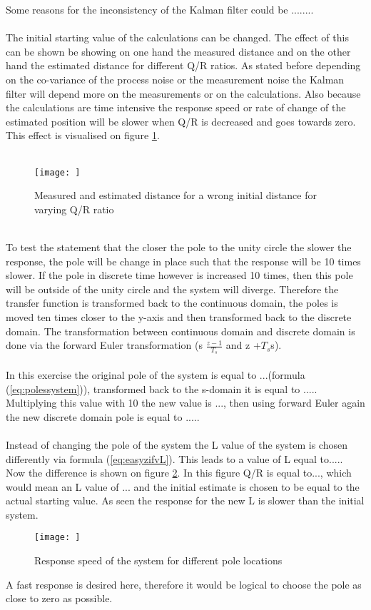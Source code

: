 Some reasons for the inconsistency of the Kalman filter could be ........\\
\\
The initial starting value of the calculations can be changed. The effect of this can be shown be showing on one hand the measured distance and on the other hand the estimated distance for different Q/R ratios. As stated before depending on the co-variance of the process noise or the measurement noise the Kalman filter will depend more on the measurements or on the calculations. Also because the calculations are time intensive the response speed or rate of change of the estimated position will be slower when Q/R is decreased and goes towards zero. This effect is visualised on figure \ref{fig:wronginitialestimate}.\\
\\
\begin{figure}
    \centering
    \texttt{[image: ]}
    \caption{Measured and estimated distance for a wrong initial distance for varying Q/R ratio}
    \label{fig:wronginitialestimate}
\end{figure}
\\
To test the statement that the closer the pole to the unity circle the slower the response, the pole will be change in place such that the response will be 10 times slower. If the pole in discrete time however is increased 10 times, then this pole will be outside of the unity circle and the system will diverge. Therefore the transfer function is transformed back to the continuous domain, the poles is moved ten times closer to the y-axis and then transformed back to the discrete domain. The transformation between continuous domain and discrete domain is done via the forward Euler transformation (s \rightarrow $\tfrac{z-1}{T_{s}}$ and z +$T_{s}$s).\\
\\
In this exercise the original pole of the system is equal to ...(formula (\ref{eq:polessystem})), transformed back to the s-domain it is equal to ..... Multiplying this value with 10 the new value is ..., then using forward Euler again the new discrete domain pole is equal to .....\\
\\
Instead of changing the pole of the system the L value of the system is chosen differently via formula (\ref{eq:easyzifvL}). This leads to a value of L equal to..... Now the difference is shown on figure \ref{fig:differentL}. In this figure Q/R is equal to..., which would mean an L value of ... and the initial estimate is chosen to be equal to the actual starting value. As seen the response for the new L is slower than the initial system.
\begin{figure}
    \centering
    \texttt{[image: ]}
    \caption{Response speed of the system for different pole locations}
    \label{fig:differentL}
\end{figure}
A fast response is desired here, therefore it would be logical to choose the pole as close to zero as possible.
